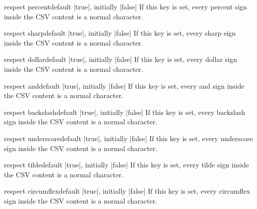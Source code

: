 \documentclass[a4paper,11pt]{ltxdoc}
\begin{document}
\begin{docCsvKey}{respect percent}{}{default |true|, initially |false|}
  If this key is set, every
  percent sign \verbbox{\%}
  inside the CSV content is a normal character.
\end{docCsvKey}

\begin{docCsvKey}{respect sharp}{}{default |true|, initially |false|}
  If this key is set, every
  sharp sign \verbbox{\#}
  inside the CSV content is a normal character.
\end{docCsvKey}

\begin{docCsvKey}{respect dollar}{}{default |true|, initially |false|}
  If this key is set, every
  dollar sign \verbbox{\$}
  inside the CSV content is a normal character.
\end{docCsvKey}

\begin{docCsvKey}{respect and}{}{default |true|, initially |false|}
  If this key is set, every
  and sign \verbbox{\&}
  inside the CSV content is a normal character.
\end{docCsvKey}

\begin{docCsvKey}{respect backslash}{}{default |true|, initially |false|}
  If this key is set, every
  backslash sign \verbbox{\textbackslash}
  inside the CSV content is a normal character.
\end{docCsvKey}

\begin{docCsvKey}{respect underscore}{}{default |true|, initially |false|}
  If this key is set, every
  underscore sign \verbbox{\_}
  inside the CSV content is a normal character.
\end{docCsvKey}

\begin{docCsvKey}{respect tilde}{}{default |true|, initially |false|}
  If this key is set, every
  tilde sign \verbbox{\textasciitilde}
  inside the CSV content is a normal character.
\end{docCsvKey}

\begin{docCsvKey}{respect circumflex}{}{default |true|, initially |false|}
  If this key is set, every
  circumflex sign \verbbox{\textasciicircum}
  inside the CSV content is a normal character.
\end{docCsvKey}
\end{document}
